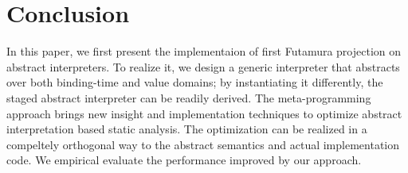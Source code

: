 \section{Conclusion}

In this paper, we first present the implementaion of first Futamura projection
on abstract interpreters. To realize it, we design a generic interpreter that
abstracts over both binding-time and value domains; by instantiating it
differently, the staged abstract interpreter can be readily derived.
The meta-programming approach brings new insight and implementation techniques
to optimize abstract interpretation based static analysis. The optimization can
be realized in a compeltely orthogonal way to the abstract semantics and actual
implementation code. We empirical evaluate the performance improved by our approach.

